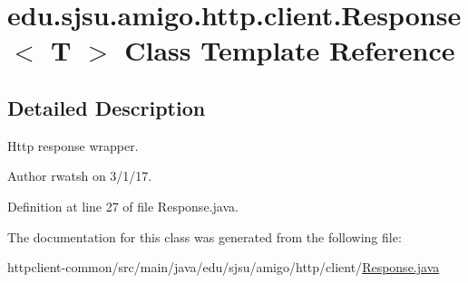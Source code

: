 \hypertarget{classedu_1_1sjsu_1_1amigo_1_1http_1_1client_1_1_response}{}\section{edu.\+sjsu.\+amigo.\+http.\+client.\+Response$<$ T $>$ Class Template Reference}
\label{classedu_1_1sjsu_1_1amigo_1_1http_1_1client_1_1_response}


\subsection{Detailed Description}
Http response wrapper.

\begin{DoxyAuthor}{Author}
rwatsh on 3/1/17. 
\end{DoxyAuthor}


Definition at line 27 of file Response.\+java.



The documentation for this class was generated from the following file\+:\begin{DoxyCompactItemize}
\item 
httpclient-\/common/src/main/java/edu/sjsu/amigo/http/client/\hyperlink{httpclient-common_2src_2main_2java_2edu_2sjsu_2amigo_2http_2client_2_response_8java}{Response.\+java}\end{DoxyCompactItemize}
